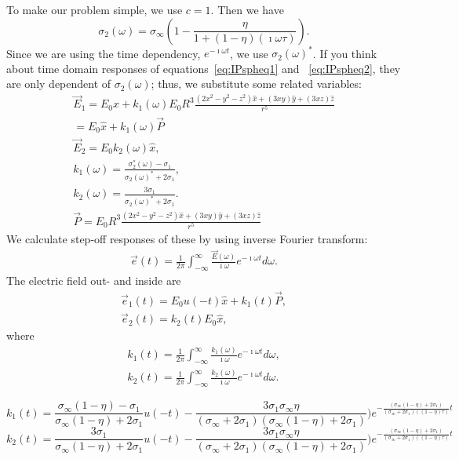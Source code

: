 \documentclass[a4paper, 11pt]{article}
\newcommand {\E}{{\vec E}}
\newcommand{\siginf}{\sigma_\infty}
\newcommand {\e}  { {\vec e} }
\begin{document}
To make our problem simple, we use $c=1$. Then we have
\begin{displaymath}
	\sigma_2(\omega) = \siginf(1-\frac{\eta}{1+(1-\eta)(\imath\omega\tau)}).
\end{displaymath}
Since we are using the time dependency, $e^{-\imath\omega t}$, we use $\sigma_2(\omega)^*$. If you think about time domain responses of equations~\ref{eq:IPspheq1} and ~\ref{eq:IPspheq2}, they are only dependent of $\sigma_2(\omega)$; thus, we substitute some related variables:
\begin{align*}
	\E_1 = E_0\hat{x}+k_1(\omega)E_0R^3\frac{(2x^2-y^2-z^2)\hat{x}+(3xy)\hat{y}+(3xz)\hat{z}}{r^5}\\
	=E_0\hat{x}+k_1(\omega)\vec{P} \\
	\E_2 = E_0k_2(\omega)\hat{x},\\
	k_1(\omega)=\frac{\sigma_2^*(\omega)-\sigma_1}{\sigma_2(\omega)^*+2\sigma_1},\\
	k_2(\omega)=\frac{3\sigma_1}{\sigma_2(\omega)^*+2\sigma_1}.\\
	\vec{P} = E_0R^3\frac{(2x^2-y^2-z^2)\hat{x}+(3xy)\hat{y}+(3xz)\hat{z}}{r^5}
\end{align*}
We calculate step-off responses of these by using inverse Fourier transform:
\begin{align*}
	\e(t) = \frac{1}{2\pi}\int_{-\infty}^{\infty}\frac{\E(\omega)}{\imath\omega}e^{-\imath\omega t} d\omega.
\end{align*}
The electric field out- and inside are
\begin{align*}
	\e_1(t) = E_0u(-t)\hat{x} + k_1(t)\vec{P}, \\
	\e_2(t) = k_2(t)E_0\hat{x},
\end{align*}
where
\begin{align*}
	k_1(t) = \frac{1}{2\pi}\int_{-\infty}^{\infty}\frac{k_1(\omega)}{\imath\omega}e^{-\imath\omega t} d\omega, \\
	k_2(t) = \frac{1}{2\pi}\int_{-\infty}^{\infty}\frac{k_2(\omega)}{\imath\omega}e^{-\imath\omega t} d\omega.
\end{align*}

\begin{equation*}
	k_1(t) = \frac{\siginf(1-\eta)-\sigma_1}{\siginf(1-\eta)+2\sigma_1}u(-t)
	- \frac{3\sigma_1\siginf\eta}{(\siginf+2\sigma_1)(\siginf(1-\eta)+2\sigma_1)})
	e^{-\frac{(\siginf(1-\eta)+2\sigma_1)}{(\siginf + 2\sigma_1)((1-\eta)\tau)}t}
\end{equation*}
\begin{equation*}
	k_2(t) = \frac{3\sigma_1}{\siginf(1-\eta)+2\sigma_1}u(-t)
	- \frac{3\sigma_1\siginf\eta}{(\siginf+2\sigma_1)(\siginf(1-\eta)+2\sigma_1)})
	e^{-\frac{(\siginf(1-\eta)+2\sigma_1)}{(\siginf + 2\sigma_1)((1-\eta)\tau)}t}
\end{equation*}
\end{document}
